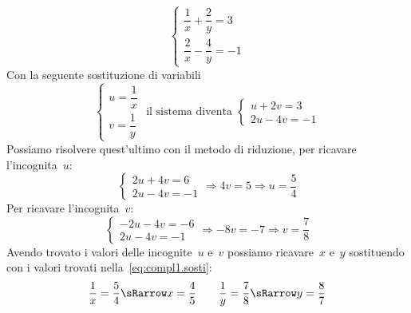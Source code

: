  \begin{esempio}{}{}
\[%
  \left\{\begin{array}{l}
  \dfrac{1}{x}+\dfrac{2}{y}=3\\
  \dfrac{2}{x}-\dfrac{4}{y}=-1 
\end{array}\right.\]
Con la seguente sostituzione di variabili
\label{eq:compl1.sosti}
\[%
\left\{\begin{array}{l}
  u=\dfrac{1}{x}\\
  v=\dfrac{1}{y}
\end{array}\right.
 \text{ il sistema diventa }
\left\{\begin{array}{l}
  u+2v=3 \\
  2u-4v=-1 
\end{array}\right.\]
Possiamo risolvere quest'ultimo con il metodo di riduzione, 
per ricavare l'incognita~\(u\):
\[\left\{\begin{array}{l}
2u+4v=6 \\
2u-4v=-1
\end{array}\right. \Rightarrow 4v=5 \Rightarrow u=\frac{5}{4}\]
Per ricavare l'incognita~\(v\):
\[\left\{\begin{array}{l}
-2u-4v=-6 \\
2u-4v=-1 \end{array}\right. \Rightarrow 
-8v=-7 \Rightarrow v=\frac{7}{8}\]
Avendo trovato i valori delle incognite~\(u\) e~\(v\) possiamo 
ricavare~\(x\) 
e~\(y\) sostituendo con i valori trovati nella~\ref{eq:compl1.sosti}:
\[\dfrac{1}{x}=\dfrac{5}{4} \sRarrow x=\dfrac{4}{5} \qquad
  \dfrac{1}{y}=\dfrac{7}{8} \sRarrow y=\dfrac{8}{7}\]
 \end{esempio}

